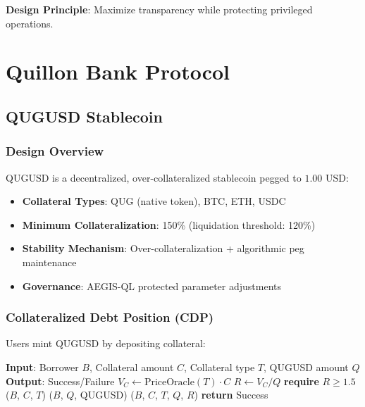 \documentclass[11pt,a4paper]{article}
\begin{document}
\textbf{Design Principle}: Maximize transparency while protecting privileged operations.

\section{Quillon Bank Protocol}

\subsection{QUGUSD Stablecoin}

\subsubsection{Design Overview}

QUGUSD is a decentralized, over-collateralized stablecoin pegged to $1.00$ USD:

\begin{itemize}[leftmargin=*]
    \item \textbf{Collateral Types}: QUG (native token), BTC, ETH, USDC
    \item \textbf{Minimum Collateralization}: 150\% (liquidation threshold: 120\%)
    \item \textbf{Stability Mechanism}: Over-collateralization + algorithmic peg maintenance
    \item \textbf{Governance}: AEGIS-QL protected parameter adjustments
\end{itemize}

\subsubsection{Collateralized Debt Position (CDP)}

Users mint QUGUSD by depositing collateral:

\begin{algorithm}[H]
\caption{QUGUSD Minting}
\begin{algorithmic}[1]
\State \textbf{Input}: Borrower $B$, Collateral amount $C$, Collateral type $T$, QUGUSD amount $Q$
\State \textbf{Output}: Success/Failure
\State
\State $V_C \leftarrow \text{PriceOracle}(T) \cdot C$ 
\State $R \leftarrow V_C / Q$ 
\State
\State \textbf{require} $R \geq 1.5$ 
\State
\State {}($B$, $C$, $T$) 
\State {}($B$, $Q$, QUGUSD) 
\State {}($B$, $C$, $T$, $Q$, $R$) 
\State
\State \textbf{return} Success
\end{algorithmic}
\end{algorithm}
\end{document}
